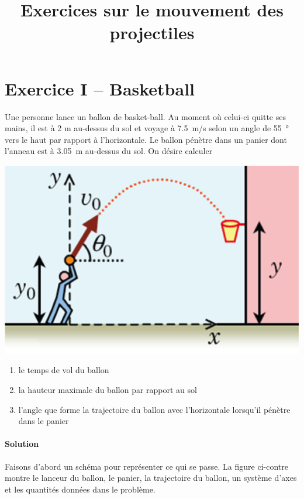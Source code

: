 \documentclass{tufte-handout}
\title{Exercices sur le mouvement des projectiles}
\date{}
\begin{document}
\maketitle
\vspace{0.5cm}

\section{Exercice I -- Basketball}

Une personne lance un ballon de basket-ball.  Au moment où celui-ci quitte
ses mains, il est à 2 m au-dessus du sol et voyage à \SI{7.5}{m/s} selon un
angle de \SI{55}{\degree} vers le haut par rapport à l'horizontale.  Le
ballon pénètre dans un panier dont l'anneau est à \SI{3.05}{m} au-dessus du
sol.  On désire calculer
\begin{marginfigure}
  \includegraphics[scale=0.6]{basket.png}
\end{marginfigure}

\begin{enumerate}
  \item le temps de vol du ballon
  \item la hauteur maximale du ballon par rapport au sol
  \item l'angle que forme la trajectoire du ballon avec l'horizontale lorsqu'il
        pénètre dans le panier
\end{enumerate}


\paragraph{Solution}
Faisons d'abord un schéma pour représenter ce qui se passe.  La figure
ci-contre montre le lanceur du ballon, le panier, la trajectoire du ballon, un
système d'axes et les quantités données dans le problème.
\end{document}
